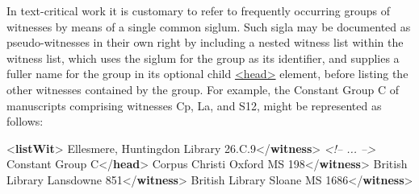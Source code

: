 In text-critical work it is customary to refer to frequently occurring groups of witnesses by means of a single common siglum. Such sigla may be documented as pseudo-witnesses in their own right by including a nested witness list within the witness list, which uses the siglum for the group as its identifier, and supplies a fuller name for the group in its optional child \hyperref[TEI.head]{<head>} element, before listing the other witnesses contained by the group. For example, the Constant Group C of manuscripts comprising witnesses Cp, La, and S12, might be represented as follows: \par\bgroup{}\exampleFont \begin{shaded}\noindent\mbox{}{<\textbf{listWit}>}\mbox{}\newline 
{}Ellesmere, Huntingdon Library 26.C.9{</\textbf{witness}>}\mbox{}\newline 
\textit{<!-- ... -->}\mbox{}\newline 
{}\mbox{}\newline 
\hspace*{1em}Constant Group C{</\textbf{head}>}\mbox{}\newline 
\hspace*{1em}Corpus Christi Oxford MS 198{</\textbf{witness}>}\mbox{}\newline 
\hspace*{1em}British Library Lansdowne 851{</\textbf{witness}>}\mbox{}\newline 
\hspace*{1em}British Library Sloane MS 1686{</\textbf{witness}>}\mbox{}\newline 

\end{shaded}
